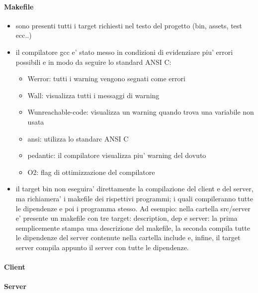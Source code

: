 \documentclass[12pt]{article}
\begin{document}
\paragraph{Makefile}
\begin{itemize}
    \item sono presenti tutti i target richiesti nel testo del progetto (bin, assets, test ecc..)
    \item il compilatore gcc e' stato messo in condizioni di evidenziare piu' errori possibili e in modo da seguire lo standard ANSI C:
    \begin{itemize}
        \item Werror: tutti i warning vengono segnati come errori    
        \item Wall: visualizza tutti i messaggi di warning
        \item Wunreachable-code: visualizza un warning quando trova una variabile non usata
        \item ansi: utilizza lo standarc ANSI C
        \item pedantic: il compilatore visualizza piu' warning del dovuto
        \item O2: flag di ottimizzazione del compilatore
    \end{itemize}
    \item il target bin non eseguira' direttamente la compilazione del client e del server, ma richiamera' i makefile dei rispettivi programmi; i quali compileranno tutte le dipendenze e poi i programma stesso. Ad esempio: nella cartella src/server e' presente un makefile con tre target: description, dep e server: la prima semplicemente stampa una descrizione del makefile, la seconda compila tutte le dipendenze del server contenute nella cartella include e, infine, il target server compila appunto il server con tutte le dipendenze. 
\end{itemize} 


\paragraph{Client}

\paragraph{Server}
\end{document}
